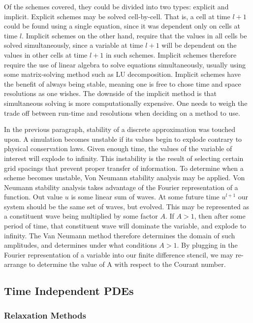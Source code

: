 \documentclass[twocolumn]{article}
\begin{document}
Of the schemes covered, they could be divided into two types: explicit and implicit. Explicit schemes may be solved cell-by-cell. That is, a cell at time $l+1$ could be found using a single equation, since it was dependent only on cells at time $l$. Implicit schemes on the other hand, require that the values in all cells be solved simultaneously, since a variable at time $l+1$ will be dependent on the values in other cells at time $l+1$ in such schemes. Implicit schemes therefore require the use of linear algebra to solve equations simultaneously, usually using some matrix-solving method such as LU decomposition. Implicit schemes have the benefit of always being stable, meaning one is free to chose time and space resolutions as one wishes. The downside of the implicit method is that simultaneous solving is more computationally expensive. One needs to weigh the trade off between run-time and resolutions when deciding on a method to use. 

In the previous paragraph, stability of a discrete approximation was touched upon. A simulation becomes unstable if its values begin to explode contrary to physical conservation laws. Given enough time, the values of the variable of interest will explode to infinity. This instability is the result of selecting certain grid spacings that prevent proper transfer of information. To determine when a scheme becomes unstable, Von Neumann stability analysis may be applied. Von Neumann stability analysis takes advantage of the Fourier representation of a function. Out value $u$ is some linear sum of waves. At some future time $u^{l+1}$ our system should be the same set of waves, but evolved. This may be represented as a constituent wave being multiplied by some factor $A$. If $A>1$, then after some period of time, that constituent wave will dominate the variable, and explode to infinity. The Van Neumann method therefore determines the domain of such amplitudes, and determines under what conditions $A>1$. By plugging in the Fourier representation of a variable into our finite difference stencil, we may re-arrange to determine the value of A with respect to the Courant number.


\subsection{Time Independent PDEs}
\subsubsection{Relaxation Methods}
\end{document}
